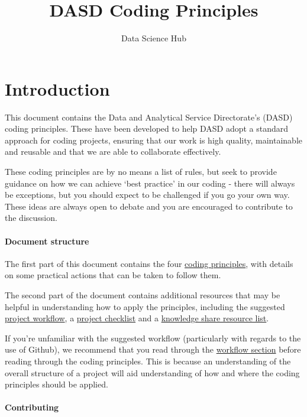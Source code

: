 \documentclass[]{book}
\title{DASD Coding Principles}
\author{Data Science Hub}
\date{}
\begin{document}
\maketitle

{
\setcounter{tocdepth}{1}
\tableofcontents
}
\hypertarget{intro}{%
\chapter*{Introduction}\label{intro}}

This document contains the Data and Analytical Service Directorate's (DASD) coding principles. These have been developed to help DASD adopt a standard approach for coding projects, ensuring that our work is high quality, maintainable and reusable and that we are able to collaborate effectively.

These coding principles are by no means a list of rules, but seek to provide guidance on how we can achieve `best practice' in our coding - there will always be exceptions, but you should expect to be challenged if you go your own way. These ideas are always open to debate and you are encouraged to contribute to the discussion.

\hypertarget{structure}{%
\subsubsection*{Document structure}\label{structure}}

The first part of this document contains the four \protect\hyperlink{principles}{coding principles}, with details on some practical actions that can be taken to follow them.

The second part of the document contains additional resources that may be helpful in understanding how to apply the principles, including the suggested \protect\hyperlink{wf}{project workflow}, a \protect\hyperlink{checklist}{project checklist} and a \protect\hyperlink{ksresources}{knowledge share resource list}.

If you're unfamiliar with the suggested workflow (particularly with regards to the use of Github), we recommend that you read through the \protect\hyperlink{wf}{workflow section} before reading through the coding principles. This is because an understanding of the overall structure of a project will aid understanding of how and where the coding principles should be applied.

\hypertarget{contributing}{%
\subsubsection*{Contributing}\label{contributing}}
\end{document}
